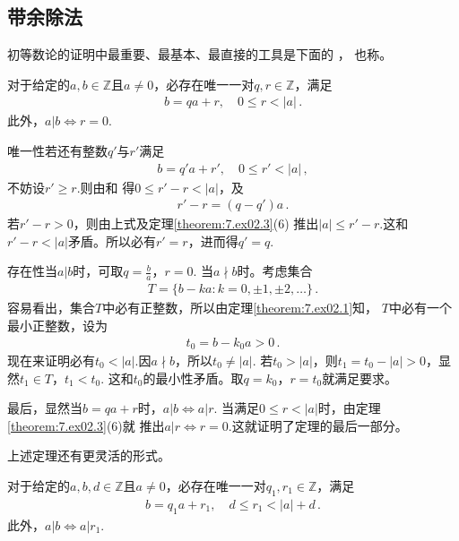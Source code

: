 \subsection*{带余除法}
初等数论的证明中最重要、最基本、最直接的工具是下面的
，
也称。
\begin{theorem}\label{theorem:7.ex02.4}
    对于给定的$a,b\in\mathbb{Z}$且$a\neq0$，必存在唯一一对$q,r\in\mathbb{Z}$，满足
    \begin{align}\label{eq:7.ex02.EuclideanDivision}
        b=qa+r,\quad 0\le r<|a|\, .
    \end{align}
    此外，$a|b \Leftrightarrow r=0$.
\end{theorem}
\begin{prove}
    {\sffamily 唯一性}\quad 若还有整数$q'$与$r'$满足
    \begin{align}\label{eq:7.ex02.prove-theorem4-01}
        b=q'a+r',\quad 0\le r'<|a|\, ,
    \end{align}
    不妨设$r'\ge r$.则由和
    得$0\le r'-r<|a|$，及
    \begin{align}
        r'-r=(q-q')a\, .
    \end{align}
    若$r'-r>0$，则由上式及定理\ref{theorem:7.ex02.3}(6)
    推出$|a|\le r'-r$.这和$r'-r<|a|$矛盾。所以必有$r'=r$，进而得$q'=q$.

        {\sffamily 存在性}\quad 当$a|b$时，可取$q=\displaystyle\frac{b}{a}$，$r=0$.
    当$a\nmid b$时。考虑集合
    \begin{align}
        T=\{b-ka:k=0,\pm1,\pm2,\ldots\}\, .
    \end{align}
    容易看出，集合$T$中必有正整数，所以由定理\ref{theorem:7.ex02.1}知，
    $T$中必有一个最小正整数，设为
    \begin{align}
        t_0=b-k_0a>0\, .
    \end{align}
    现在来证明必有$t_0<|a|$.因$a\nmid b$，所以$t_0\neq |a|$.
    若$t_0>|a|$，则$t_1=t_0-|a|>0$，显然$t_1\in T$，$t_1<t_0$.
    这和$t_0$的最小性矛盾。取$q=k_0$，$r=t_0$就满足要求。

    最后，显然当$b=qa+r$时，$a|b \Leftrightarrow a|r$.
    当满足$0\le r<|a|$时，由定理\ref{theorem:7.ex02.3}(6)就
    推出$a|r \Leftrightarrow r=0$.这就证明了定理的最后一部分。
\end{prove}

上述定理还有更灵活的形式。
\begin{theorem}\label{theorem:7.ex02.5}
    对于给定的$a,b,d\in\mathbb{Z}$且$a\neq0$，必存在唯一一对$q_1,r_1\in\mathbb{Z}$，满足
    \begin{align}\label{eq:7.7.ex02.remainder}
        b=q_1a+r_1,\quad d\le r_1<|a|+d\, .
    \end{align}
    此外，$a|b \Leftrightarrow a|r_1$.
\end{theorem}

